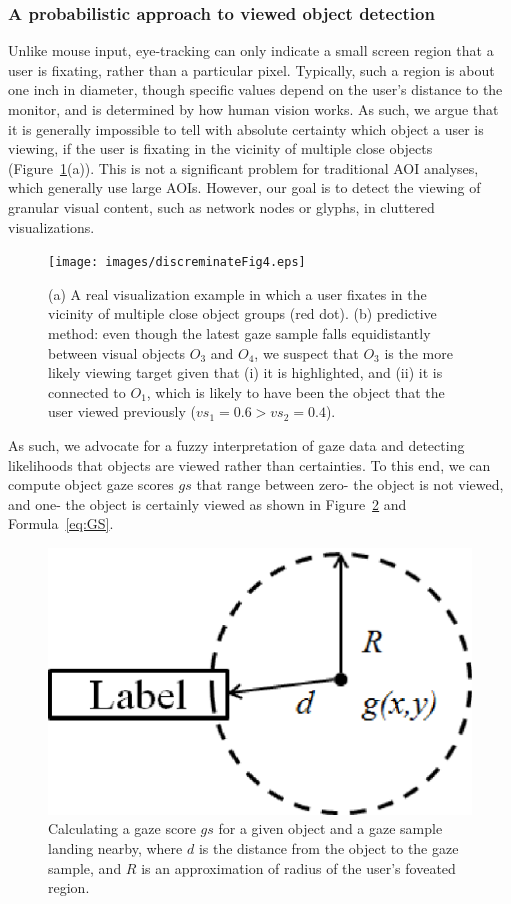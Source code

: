 \subsubsection{A probabilistic approach to viewed object detection}
\label{sec:ProbabilisticObjectDetection}
Unlike mouse input, eye-tracking can only indicate a small screen region that a user is fixating, rather than a particular pixel. Typically, such a region is about one inch in diameter, though specific values depend on the user's distance to the monitor, and is determined by how human vision works. As such, we argue that it is generally impossible to tell with absolute certainty which object a user is viewing, if the user is fixating in the vicinity of multiple close objects (Figure~\ref{fig:discreminateFig4}(a)). This is not a significant problem for traditional AOI analyses, which generally use large AOIs. However, our goal is to detect the viewing of granular visual content, such as network nodes or glyphs, in cluttered visualizations. 

\begin{figure}[htb]
  \centering
  \texttt{[image: images/discreminateFig4.eps]}
  \caption{(a) A real visualization example in which a user fixates in the vicinity of multiple close object groups (red dot). (b) predictive method: even though the latest gaze sample falls equidistantly between visual objects $O_3$ and $O_4$, we suspect that $O_3$ is the more likely viewing target given that (i) it is highlighted, and (ii) it is connected to $O_1$, which is likely to have been the object that the user viewed previously ($vs_1=0.6 > vs_2 = 0.4$). }
	\label{fig:discreminateFig4}
\end{figure}

As such, we advocate for a fuzzy interpretation of gaze data and detecting likelihoods that objects are viewed rather than certainties. To this end, we can compute object gaze scores $gs$ that range between zero- the object is not viewed, and one- the object is certainly viewed as shown in Figure~\ref{fig:gazeScoreFig3} and Formula~\ref{eq:GS}. 

\begin{figure}[htb]
  \centering
  \includegraphics[width=0.5\linewidth]{images/gazeScoreFig3.eps}
  \caption{Calculating a gaze score $gs$ for a given object and a gaze sample landing nearby, where $d$ is the distance from the object to the gaze sample, and $R$ is an approximation of radius of the user's foveated region.}
	\label{fig:gazeScoreFig3}
\end{figure}

